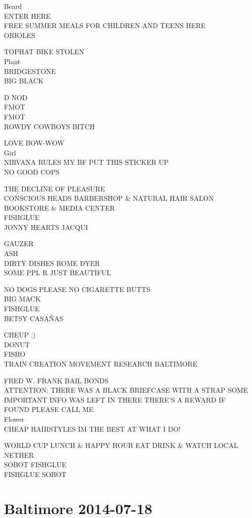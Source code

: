 \documentclass[10pt,letterpaper]{article}
\begin{document}
Beard\\
ENTER HERE\\
FREE SUMMER MEALS FOR CHILDREN AND TEENS HERE\\
ORIOLES

TOPHAT BIKE STOLEN\\
Plant\\
BRIDGESTONE\\
BIG BLACK

D NOD\\
FMOT\\
FMOT\\
ROWDY COWBOYS BITCH

LOVE BOW{-}WOW\\
Girl\\
NIRVANA RULES MY BF PUT THIS STICKER UP\\
NO GOOD COPS

THE DECLINE OF PLEASURE\\
CONSCIOUS HEADS BARBERSHOP \& NATURAL HAIR SALON BOOKSTORE \& MEDIA CENTER\\
FISHGLUE\\
JONNY HEARTS JACQUI

GAUZER\\
ASH\\
DIRTY DISHES ROME DYER\\
SOME PPL R JUST BEAUTIFUL

NO DOGS PLEASE NO CIGARETTE BUTTS\\
BIG MACK\\
FISHGLUE\\
BETSY CASAÑAS

CHEUP :)\\
DONUT\\
FISHO\\
TRAIN CREATION MOVEMENT RESEARCH BALTIMORE

FRED W. FRANK BAIL BONDS\\
ATTENTION: THERE WAS A BLACK BRIEFCASE WITH A STRAP SOME IMPORTANT INFO WAS LEFT IN THERE THERE'S A REWARD IF FOUND PLEASE CALL ME\\
Flower\\
CHEAP HAIRSTYLES IM THE BEST AT WHAT I DO!

WORLD CUP LUNCH \& HAPPY HOUR EAT DRINK \& WATCH LOCAL\\
NETHER\\
SOBOT FISHGLUE\\
FISHGLUE SOBOT


\section*{Baltimore 2014-07-18}
\end{document}
